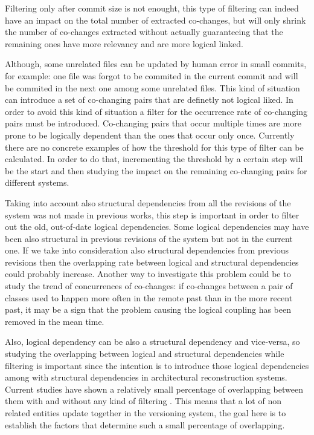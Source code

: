 \documentclass[12pt]{mitthesis}
\begin{document}
Filtering only after commit size is not enought, this type of filtering can indeed have an impact on the total number of extracted co-changes, but will only shrink the number of co-changes extracted without actually guaranteeing that the remaining ones have more relevancy and are more logical linked.

Although, some unrelated files can be updated by human error in small commits, for example: one file was forgot to be commited in the current commit and will be commited in the next one among some unrelated files. This kind of situation can introduce a set of co-changing pairs that are definetly not logical liked. In order to avoid this kind of situation a filter for the occurrence rate of co-changing pairs must be introduced. Co-changing pairs that occur multiple times are more prone to be logically dependent than the ones that occur only once. Currently there are no concrete examples of how the threshold for this type of filter can be calculated. In order to do that, incrementing the threshold by a certain step will be the start and then studying the impact on the remaining co-changing pairs for different systems. 

Taking into account also structural dependencies from all the revisions of the system was not made in previous works, this step is important in order to filter out the old, out-of-date logical dependencies. Some logical dependencies may have been also structural in previous revisions of the system but not in the current one. If we take into consideration also structural dependencies from previous revisions then the overlapping rate between logical and structural dependencies could probably increase. Another way to investigate this problem could be to study the trend of concurrences of co-changes: if co-changes between a pair of classes used to happen more often in the remote past than in the more recent past, it may be a sign that the problem causing the logical coupling has been removed in the mean time. 

Also, logical dependency can be also a structural dependency and vice-versa, so studying the overlapping between logical and structural dependencies while filtering is important since the intention is to introduce those logical dependencies among with structural dependencies in architectural reconstruction systems. Current studies have shown a relatively small percentage of overlapping between them with and without any kind of filtering \cite{DBLP:journals/jss/AjienkaC17}. This means that a lot of non related entities update together in the versioning system, the goal here is to establish the factors that determine such a small percentage of overlapping.
\end{document}
